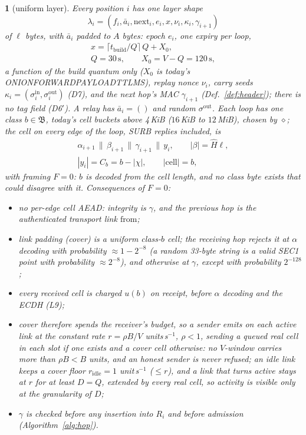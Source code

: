 \documentclass[journal]{IEEEtran}
\newcommand{\namedhead}{}
\newtheorem*{namedenv}{\namedhead}
\newenvironment{defD}[2]{\renewcommand{\namedhead}{Definition #1}%
  \begin{namedenv}[#2]}{\end{namedenv}}
\newcommand{\cl}{\diamond}
\newcommand{\nxt}{\mathrm{next}}
\newcommand{\frm}{\mathrm{from}}
\newcommand{\Hm}{\hat H}
\DeclareRobustCommand{\code}[1]{{\ttfamily\renewcommand{\_}{\textunderscore\allowbreak}#1}}
\begin{document}
\begin{defD}{D6}{uniform layer}
Every position $i$ has one layer shape
\[
\lambda_i=(f_i,\bar a_i,\nxt_i,e_i,x,\nu_i,\kappa_i,\gamma_{i+1})
\]
of $\ell$ bytes, with $\bar a_i$ padded to $A$ bytes: epoch $e_i$, one
expiry per loop,
\begin{gather*}
x=\lceil t_{\mathrm{build}}/Q\rceil\,Q+X_0,\\
Q=30\,\mathrm{s},\qquad X_0=V-Q=120\,\mathrm{s},
\end{gather*}
a function of the build quantum only ($X_0$ is today's
\code{ONION\_FORWARD\_PAYLOAD\_TTL\_MS}), replay nonce
$\nu_i$, carry seeds $\kappa_i=(\sigma^{\mathrm{in}}_i,\sigma^{\mathrm{out}}_i)$
(D7), and the next hop's MAC $\gamma_{i+1}$ (Def.~\ref{def:header}); there
is no tag field (D6$'$).  A relay has $\bar a_i=()$ and random
$\sigma^{\mathrm{out}}$.  Each loop has one class $b\in\mathfrak B$, today's
cell buckets above 4\,KiB ($16$\,KiB to $12$\,MiB), chosen by $\cl$; the
cell on every edge of the loop, SURB replies included, is
\begin{gather*}
\alpha_{i+1}\,\|\,\beta_{i+1}\,\|\,\gamma_{i+1}\,\|\,y_i,\qquad
|\beta|=\Hm\ell,\\
|y_i|=C_b=b-|\chi|,\qquad |\mathrm{cell}|=b ,
\end{gather*}
with framing $F=0$: $b$ is decoded from the cell length, and no class byte
exists that could disagree with it.  Consequences of $F=0$:
\begin{itemize}
\item no per-edge cell AEAD: integrity is $\gamma$, and the previous hop
  is the authenticated transport link $\frm$;
\item link padding (cover) is a uniform class-$b$ cell; the receiving
  hop rejects it at $\alpha$ decoding with probability $\approx1-2^{-8}$
  (a random 33-byte string is a valid SEC1 point with probability
  $\approx2^{-8}$), and otherwise at $\gamma$, except with probability
  $2^{-128}$;
\item every received cell is charged $u(b)$ on receipt, before $\alpha$
  decoding and the ECDH (L9);
\item cover therefore spends the receiver's budget, so a sender emits on
  each active link at the constant rate $r=\rho B/V$ units\,s$^{-1}$,
  $\rho<1$, sending a queued real cell in each slot if one exists and a
  cover cell otherwise: no $V$-window carries more than $\rho B<B$ units,
  and an honest sender is never refused; an idle link keeps a cover floor
  $r_{\mathrm{idle}}=1$ unit\,s$^{-1}$ ($\le r$), and a link that turns
  active stays at $r$ for at least $D=Q$, extended by every real cell, so
  activity is visible only at the granularity of $D$;
\item $\gamma$ is checked before any insertion into $R_i$ and before
  admission (Algorithm~\ref{alg:hop}).
\end{itemize}
\end{defD}
\end{document}
